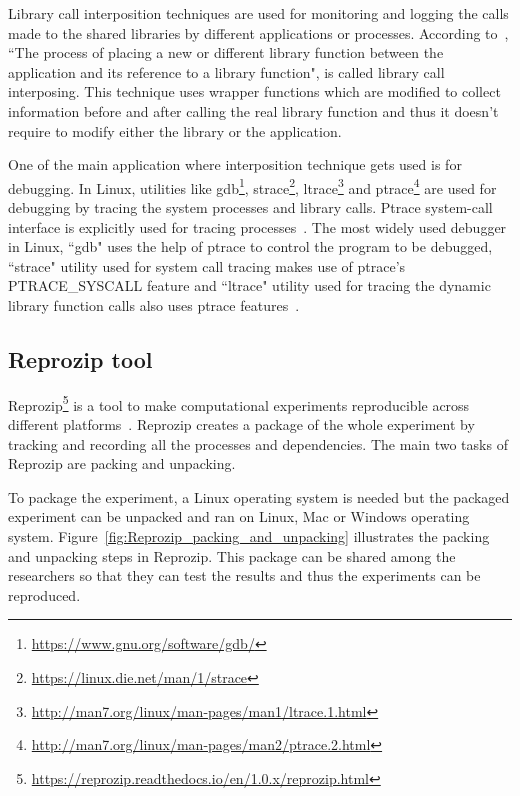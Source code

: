 Library call interposition techniques are used for monitoring and logging the calls made to the shared libraries by different applications or processes. According to~\cite{Curry:1994:PTD:1267257.1267275}, ``The process of placing a new or different library function between the application and its reference to a library function", is called library call interposing. This technique uses wrapper functions which are modified to collect information before and after calling the real library function and thus it doesn't require to modify either the library or the application.

One of the main application where interposition technique gets used is for debugging. In Linux, utilities like gdb\footnote{\url{https://www.gnu.org/software/gdb/}}, strace\footnote{\url{https://linux.die.net/man/1/strace}}, ltrace\footnote{\url{http://man7.org/linux/man-pages/man1/ltrace.1.html}} and ptrace\footnote{\url{http://man7.org/linux/man-pages/man2/ptrace.2.html}} are used for debugging by tracing the system processes and library calls. Ptrace system-call interface is explicitly used for tracing processes~\cite{Keniston_ptrace}. The most widely used debugger in Linux, ``gdb" uses the help of ptrace to control the program to be debugged, ``strace" utility used for system call tracing makes use of ptrace's PTRACE\_SYSCALL feature and ``ltrace" utility used for tracing the dynamic library function calls also uses ptrace features~\cite{Keniston_ptrace}.

\subsection{Reprozip tool}
Reprozip\footnote{\url{https://reprozip.readthedocs.io/en/1.0.x/reprozip.html}} is a tool to make computational experiments reproducible across different platforms~\cite{Chirigati:2013:RUP:2482613.2482614}. Reprozip creates a package of the whole experiment by tracking and recording all the processes and dependencies. The main two tasks of Reprozip are packing and unpacking.

To package the experiment, a Linux operating system is needed but the packaged experiment can be unpacked and ran on Linux, Mac or Windows operating system. Figure~\ref{fig:Reprozip_packing_and_unpacking} illustrates the packing and unpacking steps in Reprozip. This package can be shared among the researchers so that they can test the results and thus the experiments can be reproduced.

